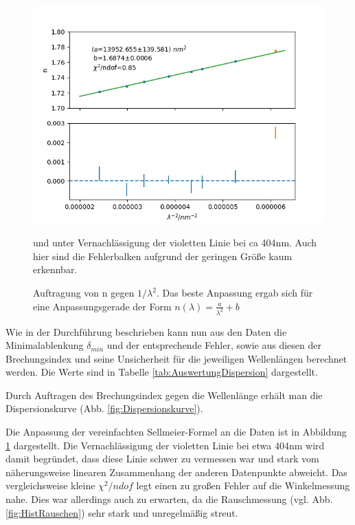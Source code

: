 \documentclass[12pt,a4paper]{article}
\begin{document}
	\begin{figure}
		\includegraphics[scale=1.0]{Bilder/Regression.png}
		\caption{Auftragung von n gegen $1/\lambda^2$. Das beste Anpassung ergab sich für eine Anpassungsgerade der Form $n(\lambda) = \frac{a}{\lambda^2} + b $} und unter Vernachlässigung der violetten Linie bei ca 404nm. Auch hier sind die Fehlerbalken aufgrund der geringen Größe kaum erkennbar.
		\label{fig:RegressionDispersion}
	\end{figure}
	
	
	Wie in der Durchführung beschrieben kann nun aus den Daten die Minimalablenkung $\delta_{min}$ und der entsprechende Fehler, sowie aus diesen der Brechungsindex und seine Unsicherheit für die jeweiligen Wellenlängen berechnet werden.
	Die Werte sind in Tabelle \ref{tab:AuswertungDispersion} dargestellt.
	
	Durch Auftragen des Brechungsindex gegen die Wellenlänge erhält man die Dispersionskurve (Abb. \ref{fig:Dispersionskurve}).
	
	Die Anpassung der vereinfachten Sellmeier-Formel an die Daten ist in Abbildung \ref{fig:RegressionDispersion} dargestellt. Die Vernachlässigung der violetten Linie bei etwa 404nm wird damit begründet, dass diese Linie schwer zu vermessen war und stark vom näherungsweise linearen Zusammenhang der anderen Datenpunkte abweicht.
	Das vergleichsweise kleine $\chi^2 / ndof$ legt einen zu großen Fehler auf die Winkelmessung nahe. Dies war allerdings auch zu erwarten, da die Rauschmessung (vgl. Abb. \ref{fig:HistRauschen}) sehr stark und unregelmäßig streut.
\end{document}
